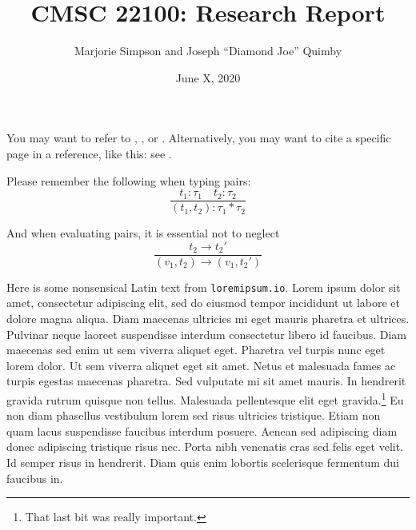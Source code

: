 \documentclass[12pt]{article}
\begin{document}
\title{CMSC 22100: Research Report}
\author{Marjorie Simpson and Joseph ``Diamond Joe'' Quimby}
\date{June X, 2020}

\maketitle

You may want to refer to \cite{tapl}, \cite{sipoly}, or \cite{adhoc}. Alternatively,
you may want to cite a specific page in a reference, like this: see
\cite[p.~123]{tapl}.

Please remember the following when typing pairs:
\begin{displaymath}
  \frac{t_1 : \tau_1 \hspace{1em} t_2 : \tau_2}
       {(t_1, t_2) : \tau_1 * \tau_2}
\end{displaymath}

And when evaluating pairs, it is essential not to neglect
\begin{displaymath}
  \frac{t_2 \rightarrow {t_2}'}
       {(v_1, t_2) \rightarrow (v_1,{t_2}')}
\end{displaymath}

Here is some nonsensical Latin text from \texttt{loremipsum.io}. Lorem
ipsum dolor sit amet, consectetur adipiscing elit, sed do eiusmod
tempor incididunt ut labore et dolore magna aliqua. Diam maecenas
ultricies mi eget mauris pharetra et ultrices. Pulvinar neque laoreet
suspendisse interdum consectetur libero id faucibus. Diam maecenas sed
enim ut sem viverra aliquet eget. Pharetra vel turpis nunc eget lorem
dolor. Ut sem viverra aliquet eget sit amet. Netus et malesuada fames
ac turpis egestas maecenas pharetra. Sed vulputate mi sit amet
mauris. In hendrerit gravida rutrum quisque non tellus. Malesuada
pellentesque elit eget gravida.\footnote{That last bit was really
  important.} Eu non diam phasellus vestibulum lorem sed risus
ultricies tristique. Etiam non quam lacus suspendisse faucibus
interdum posuere. Aenean sed adipiscing diam donec adipiscing
tristique risus nec. Porta nibh venenatis cras sed felis eget
velit. Id semper risus in hendrerit. Diam quis enim lobortis
scelerisque fermentum dui faucibus in.
  
\end{document}
